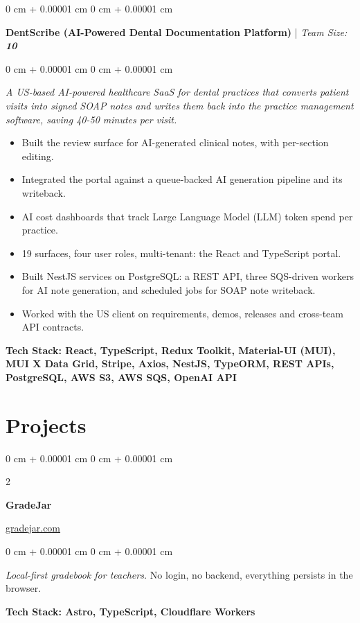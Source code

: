 \documentclass[10pt, letterpaper]{article}
\newenvironment{highlights}{
    \begin{itemize}[
        topsep=0.12 cm,
        leftsep=0.20cm,
        parsep=0.12 cm,
        partopsep=0pt,
        parindent=4pt,
        itemsep=4pt,
        leftmargin=0 cm + 20pt
    ]
}{
    \end{itemize}
}
\newenvironment{onecolentry}{
    \begin{adjustwidth}{
        0 cm + 0.00001 cm
    }{
        0 cm + 0.00001 cm
    }
}{
    \end{adjustwidth}
}
\newenvironment{twocolentry}[2][]{
    \onecolentry
    \def\secondColumn{#2}
    \setcolumnwidth{\fill, 4.5 cm}
    \begin{paracol}{2}
}{
    \switchcolumn \raggedleft \secondColumn
    \end{paracol}
    \endonecolentry
}
\let\hrefWithoutArrow\href
\begin{document}
    \begin{onecolentry}
        \textbf{DentScribe (AI-Powered Dental Documentation Platform)} | \textit{Team Size:} \textbf{\textit{10}}
    \end{onecolentry}
    \vspace{0.10 cm}
    \begin{onecolentry}
        \textit{A US-based AI-powered healthcare SaaS for dental practices that converts patient visits into signed SOAP notes and writes them back into the practice management software, saving 40-50 minutes per visit.}
        \begin{highlights}
            \item Built the review surface for AI-generated clinical notes, with per-section editing.
            \item Integrated the portal against a queue-backed AI generation pipeline and its writeback.
            \item AI cost dashboards that track Large Language Model (LLM) token spend per practice.
            \item 19 surfaces, four user roles, multi-tenant: the React and TypeScript portal.
            \item Built NestJS services on PostgreSQL: a REST API, three SQS-driven workers for AI note generation, and scheduled jobs for SOAP note writeback.
            \item Worked with the US client on requirements, demos, releases and cross-team API contracts.
        \end{highlights}
        \vspace{0.10 cm}
        \textbf{Tech Stack: React, TypeScript, Redux Toolkit, Material-UI (MUI), MUI X Data Grid, Stripe, Axios, NestJS, TypeORM, REST APIs, PostgreSQL, AWS S3, AWS SQS, OpenAI API}
    \end{onecolentry}

    \section{Projects}

    \begin{twocolentry}{\hrefWithoutArrow{https://gradejar.com}{gradejar.com}}
        \textbf{GradeJar}
    \end{twocolentry}
    \vspace{0.06 cm}
    \begin{onecolentry}
        \textit{Local-first gradebook for teachers.} No login, no backend, everything persists in the browser.
        \vspace{0.06 cm}

        \textbf{Tech Stack: Astro, TypeScript, Cloudflare Workers}
    \end{onecolentry}
\end{document}
